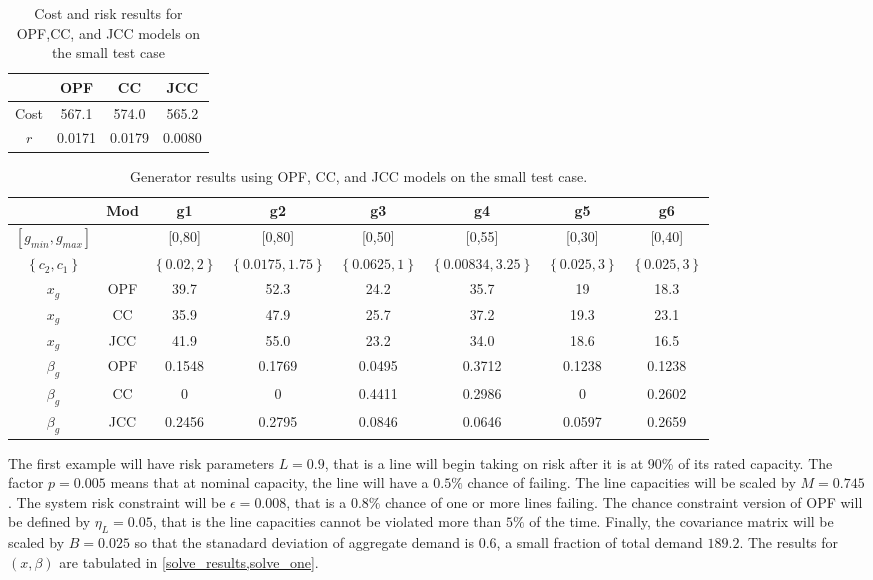 \begin{table}
\centering
\begin{tabular}{ |c| c c c |}
\hline
& OPF & CC & JCC \\
\hline
\hline
Cost & 567.1 & 574.0 & 565.2\\
$r$ & 0.0171 & 0.0179 & 0.0080\\
\hline
\end{tabular}
\caption{Cost and risk results for OPF,CC, and JCC models on the small test case}\label{solve_results}
\end{table}

\begin{table}
\centering
\scriptsize
\begin{tabular}{| c| c |c c c c c c |}
\hline
 & Mod & g1 & g2 & g3 & g4 & g5 & g6 \\
\hline
\hline
$\left[ g_{min}, g_{max} \right]$& & [0,80]&[0,80] &[0,50] &[0,55] &[0,30] &[0,40]  \\
$\left\{ c_2, c_1 \right\}$ && $\left\{0.02,2\right\}$  &$\left\{0.0175,1.75\right\}$ &$\left\{0.0625,1\right\}$ &$\left\{0.00834,3.25\right\}$ &$\left\{0.025,3\right\}$ &$\left\{0.025,3\right\}$  \\
\hline
\hline
$x_g$ &OPF& 39.7  &  52.3  &  24.2  &  35.7  &  19  &  18.3   \\
$x_g$ &CC& 35.9  &  47.9  &  25.7  &  37.2  &  19.3  &  23.1    \\
$x_g$ &JCC& 41.9  &  55.0  &  23.2  &  34.0  &  18.6  &  16.5    \\
\hline
$\beta_g$ &OPF& 0.1548  &  0.1769  &  0.0495  &  0.3712  &  0.1238  &  0.1238    \\
$\beta_g$ &CC& 0  &  0  &  0.4411  &  0.2986  &  0  &  0.2602   \\
$\beta_g$ &JCC& 0.2456  &  0.2795  &  0.0846  &  0.0646  &  0.0597  &  0.2659   \\
\hline
\end{tabular}
\caption{Generator results using OPF, CC, and JCC models on the small test case.}\label{solve_one}
\end{table}

The first example will have risk parameters $L=0.9$, that is a line will begin taking on risk after it is at 90\% of its rated capacity.  The factor $p=0.005$ means that at nominal capacity, the line will have a $0.5\%$ chance of failing.  The line capacities will be scaled by $M=0.745$. The system risk constraint will be $\epsilon=0.008$, that is a $0.8\%$ chance of one or more lines failing.  The chance constraint version of OPF will be defined by $\eta_L=0.05$, that is the line capacities cannot be violated more than $5\%$ of the time.  Finally, the covariance matrix will be scaled by $B=0.025$ so that the stanadard deviation of aggregate demand is $0.6$, a small fraction of total demand $189.2$.  The results for $(x,\beta)$ are tabulated in \cref{solve_results,solve_one}.



